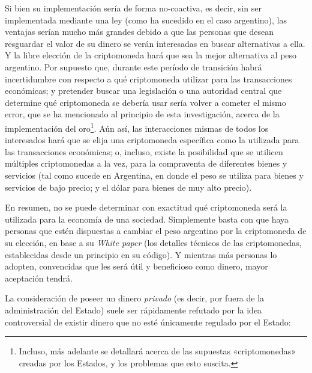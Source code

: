 \documentclass[12pt,a4paper,twoside]{book}
\begin{document}
Si bien su implementación sería de forma no-coactiva, es decir, sin ser implementada mediante una ley (como ha sucedido en el caso argentino), las ventajas serían mucho más grandes debido a que las personas que desean resguardar el valor de su dinero se verán interesadas en buscar alternativas a ella. Y la libre elección de la criptomoneda hará que sea la mejor alternativa al peso argentino. Por supuesto que, durante este período de transición habrá incertidumbre con respecto a qué criptomoneda utilizar para las transacciones económicas; y pretender buscar una legislación o una autoridad central que determine qué criptomoneda se debería usar sería volver a cometer el mismo error, que se ha mencionado al principio de esta investigación, acerca de la implementación del oro\footnote{Incluso, más adelante se detallará acerca de las supuestas «criptomonedas» creadas por los Estados, y los problemas que esto suscita.}. Aún así, las interacciones mismas de todos los interesados hará que se elija una criptomoneda específica como la utilizada para las transacciones económicas; o, incluso, existe la posibilidad que se utilicen múltiples criptomonedas a la vez, para la compraventa de diferentes bienes y servicios (tal como sucede en Argentina, en donde el peso se utiliza para bienes y servicios de bajo precio; y el dólar para bienes de muy alto precio).

En resumen, no se puede determinar con exactitud qué criptomoneda será la utilizada para la economía de una sociedad. Simplemente basta con que haya personas que estén dispuestas a cambiar el peso argentino por la criptomoneda de su elección, en base a su \textit{White paper} (los detalles técnicos de las criptomonedas, establecidas desde un principio en su código). Y mientras más personas lo adopten, convencidas que les será útil y beneficioso como dinero, mayor aceptación tendrá.

La consideración de poseer un dinero \textit{privado} (es decir, por fuera de la administración del Estado) suele ser rápidamente refutado por la idea controversial de existir dinero que no esté únicamente regulado por el Estado:
\end{document}
